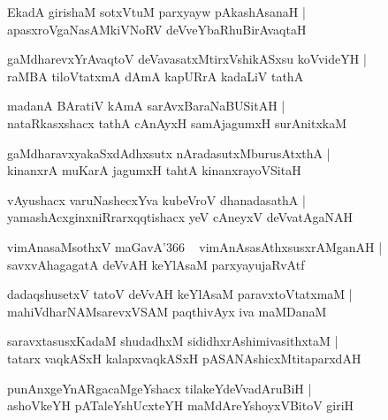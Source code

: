 \documentclass[twoside,12pt,openright]{book}
\newcounter{shloka}[chapter]
\begin{document}
\begin{shloka}%
EkadA girishaM sotxVtuM parxyayw pAkashAsanaH |\\
apasxroVgaNasAMkiVNoRV deVveYbaRhuBirAvaqtaH 
\end{shloka}

\begin{shloka}%
gaMdharevxYrAvaqtoV deVavasatxMtirxVshikASxsu koVvideYH |\\
raMBA tiloVtatxmA dAmA kapURrA kadaLiV tathA 
\end{shloka}

\begin{shloka}%
madanA BAratiV kAmA sarAvxBaraNaBUSitAH |\\
nataRkasxshacx tathA cAnAyxH samAjagumxH surAnitxkaM 
\end{shloka}

\begin{shloka}%
gaMdharavxyakaSxdAdhxsutx nAradasutxMburusAtxthA |\\
kinanxrA muKarA jagumxH tahtA kinanxrayoVSitaH 
\end{shloka}

\begin{shloka}%
vAyushacx varuNashecxYva kubeVroV dhanadasathA |\\
yamashAcxginxniRrarxqqtishacx yeV cAneyxV deVvatAgaNAH 
\end{shloka}

\begin{shloka}%
vimAnasaMsothxV maGavA\char'366  ~ vimAnAsasAthxsusxrAMganAH |\\
savxvAhagagatA deVvAH keYlAsaM parxyayujaRvAtf
\end{shloka}

\begin{shloka}%
dadaqshusetxV tatoV deVvAH keYlAsaM paravxtoVtatxmaM |\\
mahiVdharNAMsarevxVSAM paqthivAyx iva maMDanaM 
\end{shloka}

\begin{shloka}%
saravxtasusxKadaM shudadhxM sididhxrAshimivasithxtaM |\\
tatarx vaqkASxH kalapxvaqkASxH pASANAshicxMtitaparxdAH 
\end{shloka}

\begin{shloka}%
punAnxgeYnARgacaMgeYshacx tilakeYdeVvadAruBiH |\\
ashoVkeYH pATaleYshUcxteYH maMdAreYshoyxVBitoV giriH
\end{shloka}
\end{document}

